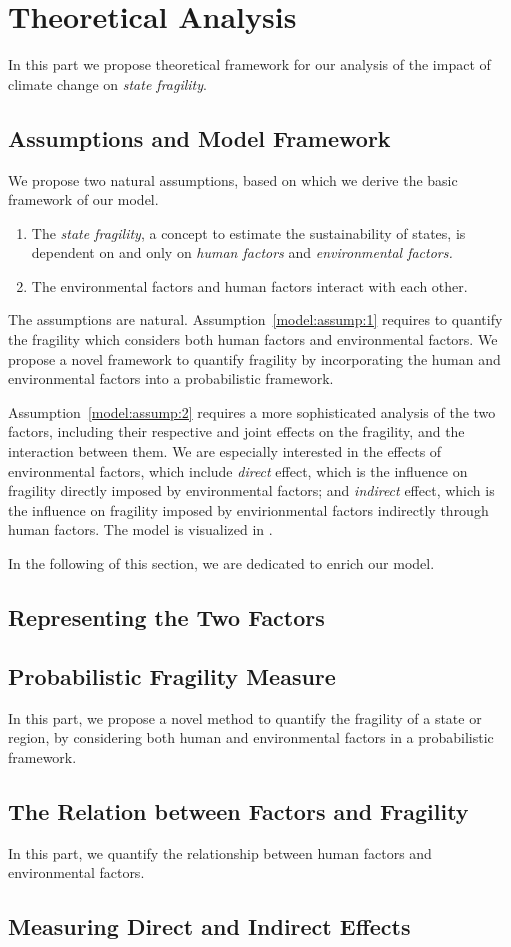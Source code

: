 \section{Theoretical Analysis}
In this part we propose theoretical framework for our analysis of the impact of climate change on \emph{state fragility}.
\subsection{Assumptions and Model Framework}
We propose two natural assumptions, based on which we derive the basic framework of our model. 
\begin{enumerate}
   \item The \emph{state fragility}, a concept to estimate the sustainability of states, is dependent on and only on \emph{human factors} and \emph{environmental factors.} \label{model:assump:1}
   \item The environmental factors and human factors interact with each other. \label{model:assump:2}
\end{enumerate}
The assumptions are natural. Assumption~\ref{model:assump:1} requires to quantify the fragility which considers both human factors and environmental factors. We propose a novel framework to quantify fragility by incorporating the human and environmental factors into a probabilistic framework.

Assumption~\ref{model:assump:2} requires a more sophisticated analysis of the two factors, including their respective and joint effects on the fragility, and the interaction between them. We are especially interested in the effects of environmental factors, which include \emph{direct} effect, which is the influence on fragility directly imposed by environmental factors; and \emph{indirect} effect, which is the influence on fragility imposed by envirionmental factors indirectly through human factors. The model is visualized in .

In the following of this section, we are dedicated to enrich our model.

\subsection{Representing the Two Factors}

\subsection{Probabilistic Fragility Measure}
In this part, we propose a novel method to quantify the fragility of a state or region, by considering both human and environmental factors in a probabilistic framework.

\subsection{The Relation between Factors and Fragility}
In this part, we quantify the relationship between human factors and environmental factors. 

\subsection{Measuring Direct and Indirect Effects}
